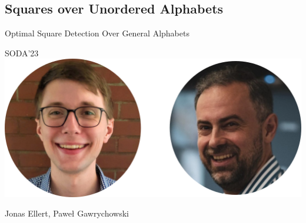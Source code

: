 \subsection{Squares over Unordered Alphabets}

\begin{frame}
    \centering
    {\Large Optimal Square Detection  Over General Alphabets}
  
    \bigskip
    {\large SODA'23}\\
    \bigskip
    \includegraphics{pictures/mindmap/squares.png}
  
    \bigskip
    Jonas Ellert, Paweł Gawrychowski
\end{frame}


